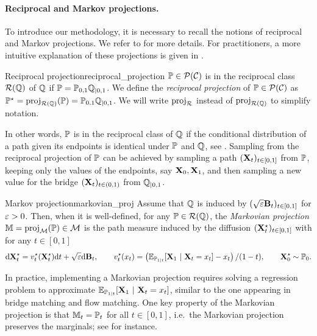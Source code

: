 \documentclass{article}
\begin{document}
\paragraph{Reciprocal and Markov projections.} To introduce our methodology, it is necessary to recall the notions of reciprocal and Markov projections. We refer to \cite{shi2023DSBM} for more details. For practitioners, a more intuitive explanation of these projections is given in .

\begin{definitionblue}{Reciprocal projection}{reciprocal_projection}
  $\mathbb{P} \in \mathcal{P}(\mathcal{C})$ is in the reciprocal class $\mathcal{R}(\mathbb{Q})$ of $\mathbb{Q}$ if
  $\mathbb{P} = \mathbb{P}_{0,1} \mathbb{Q}_{|0,1}$. 
  We define the
  \emph{reciprocal projection} of $\mathbb{P} \in \mathcal{P}(\mathcal{C})$ as
  $\mathbb{P}^\star = \mathrm{proj}_{\mathcal{R}(\mathbb{Q})}(\mathbb{P}) =  \mathbb{P}_{0,1} \mathbb{Q}_{|0,1} $. We will write $\mathrm{proj}_{\mathcal{R}}$ instead of $\mathrm{proj}_{\mathcal{R}(\mathbb{Q})}$ to simplify notation.
\end{definitionblue}
In other words, $\mathbb{P}$ is in the reciprocal class of $\mathbb{Q}$ if the conditional distribution of a path given its endpoints is identical under $\mathbb{P}$ and $\mathbb{Q}$, see \citep{roelly2013reciprocal}. Sampling from the reciprocal projection of $\mathbb{P}$ can be achieved by sampling a path $(\mathbf{X}_t)_{t\in[0,1]}$ from $\mathbb{P}$, keeping only the values of the endpoints, say $\mathbf{X}_0,\mathbf{X}_1$, and then sampling a new value for the bridge $(\mathbf{X}_t)_{t\in(0,1)}$ from $\mathbb{Q}_{|0,1}$.
\begin{definitionred}{Markov projection}{markovian_proj}
  Assume that $\mathbb{Q}$ is induced by $(\sqrt{\varepsilon} \mathbf{B}_t)_{t \in [0,1]}$ for $\varepsilon >0$. Then, when it is well-defined, for any $\mathbb{P} \in \mathcal{R}(\mathbb{Q})$, the \emph{Markovian projection} 
  $\mathbb{M} = \mathrm{proj}_{\mathcal{M}}(\mathbb{P}) \in \mathcal{M}$ is the path measure induced by the diffusion $(\mathbf{X}_t^\star)_{t \in [0,1]}$ with for any $t \in [0,1]$
  \begin{equation}
    \mathrm{d} \mathbf{X}^\star_t =  v_t^\star(\mathbf{X}^\star_t) \mathrm{d} t + \sqrt{\varepsilon} \mathrm{d} \mathbf{B}_t, \qquad v_t^\star(x_t) =  \left(\mathbb{E}_{\mathbb{P}_{1|t}}[\mathbf{X}_1 \ | \ \mathbf{X}_t = x_t] - x_t\right)/(1-t) , \qquad \mathbf{X}^\star_0 \sim \mathbb{P}_0.
  \end{equation}  
\end{definitionred}
In practice, implementing a Markovian projection requires solving a regression problem to approximate $\mathbb{E}_{\mathbb{P}_{1|t}}[\mathbf{X}_1 \ | \ \mathbf{X}_t = x_t]$, similar to the one appearing in bridge matching and flow matching. One key property of the Markovian projection is that $\mathbb{M}_t = \mathbb{P}_t$ for all $t \in [0,1]$, i.e.~the Markovian projection preserves the marginals; see \citep{peluchettinon} for instance. 
\end{document}
